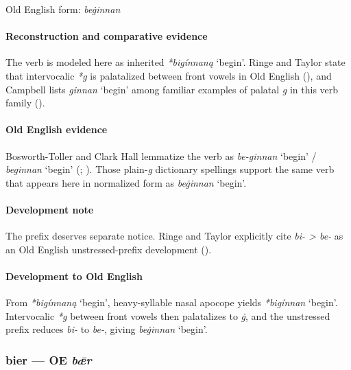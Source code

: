 \documentclass[
  british,
  a4paper,
]{article}
\providecommand{\Recon}[1]{\emph{*#1}}
\begin{document}
Old English form: \emph{beġinnan}

\paragraph{Reconstruction and comparative
evidence}\label{reconstruction-and-comparative-evidence-4}

The verb is modeled here as inherited \Recon{bigínnaną} `begin'. Ringe
and Taylor state that intervocalic \emph{*g} is palatalized between
front vowels in Old English (), and Campbell lists {\emph{ginnan}} `begin' among familiar
examples of palatal \emph{g} in this verb family
().

\paragraph{Old English evidence}\label{old-english-evidence-4}

Bosworth-Toller and Clark Hall lemmatize the verb as {\emph{be-ginnan}}
`begin' / {\emph{beginnan}} `begin'
(;
). Those plain-\emph{g}
dictionary spellings support the same verb that appears here in
normalized form as {\emph{beġinnan}} `begin'.

\paragraph{Development note}\label{development-note}

The prefix deserves separate notice. Ringe and Taylor explicitly cite
\emph{bi- \textgreater{} be-} as an Old English unstressed-prefix
development ().

\paragraph{Development to Old
English}\label{development-to-old-english-4}

From \Recon{bigínnaną} `begin', heavy-syllable nasal apocope yields
\Recon{bigínnan} `begin'. Intervocalic \emph{*g} between front vowels
then palatalizes to \emph{ġ}, and the unstressed prefix reduces
\emph{bi-} to \emph{be-}, giving {\emph{beġinnan}} `begin'.

\subsubsection{\texorpdfstring{bier --- OE
\emph{bǣr}}{bier --- OE bǣr}}\label{bier-oe-bux1e3r}
\end{document}
